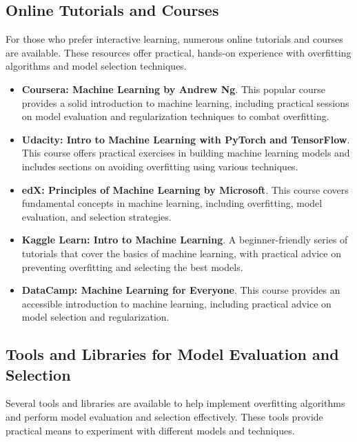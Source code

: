 \documentclass[12pt]{book} %
\begin{document}
\subsection{Online Tutorials and Courses}
For those who prefer interactive learning, numerous online tutorials and courses are available. These resources offer practical, hands-on experience with overfitting algorithms and model selection techniques.

\begin{itemize}
    \item \textbf{Coursera: Machine Learning by Andrew Ng}. This popular course provides a solid introduction to machine learning, including practical sessions on model evaluation and regularization techniques to combat overfitting.
    
    \item \textbf{Udacity: Intro to Machine Learning with PyTorch and TensorFlow}. This course offers practical exercises in building machine learning models and includes sections on avoiding overfitting using various techniques.
    
    \item \textbf{edX: Principles of Machine Learning by Microsoft}. This course covers fundamental concepts in machine learning, including overfitting, model evaluation, and selection strategies.
    
    \item \textbf{Kaggle Learn: Intro to Machine Learning}. A beginner-friendly series of tutorials that cover the basics of machine learning, with practical advice on preventing overfitting and selecting the best models.
    
    \item \textbf{DataCamp: Machine Learning for Everyone}. This course provides an accessible introduction to machine learning, including practical advice on model selection and regularization.
\end{itemize}

\subsection{Tools and Libraries for Model Evaluation and Selection}
Several tools and libraries are available to help implement overfitting algorithms and perform model evaluation and selection effectively. These tools provide practical means to experiment with different models and techniques.
\end{document}

